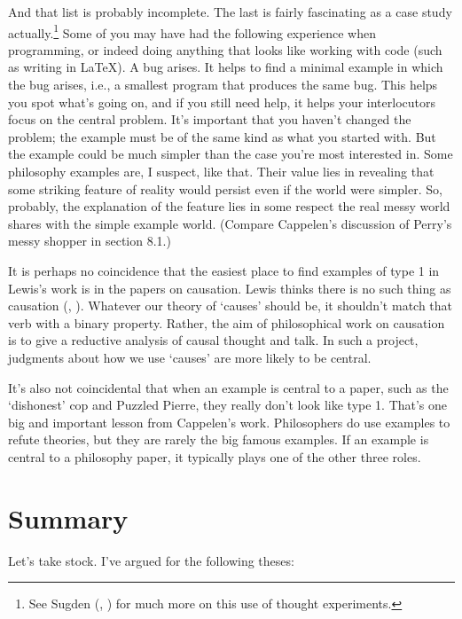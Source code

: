 \documentclass[
  11pt,
  letterpaper,
  DIV=11,
  numbers=noendperiod,
  twoside]{scrartcl}
\begin{document}
And that list is probably incomplete. The last is fairly fascinating as
a case study actually.\footnote{See Sugden
  (, ) for
  much more on this use of thought experiments.} Some of you may have
had the following experience when programming, or indeed doing anything
that looks like working with code (such as writing in LaTeX). A bug
arises. It helps to find a minimal example in which the bug arises,
i.e., a smallest program that produces the same bug. This helps you spot
what's going on, and if you still need help, it helps your interlocutors
focus on the central problem. It's important that you haven't changed
the problem; the example must be of the same kind as what you started
with. But the example could be much simpler than the case you're most
interested in. Some philosophy examples are, I suspect, like that. Their
value lies in revealing that some striking feature of reality would
persist even if the world were simpler. So, probably, the explanation of
the feature lies in some respect the real messy world shares with the
simple example world. (Compare Cappelen's discussion of Perry's messy
shopper in section 8.1.)

It is perhaps no coincidence that the easiest place to find examples of
type 1 in Lewis's work is in the papers on causation. Lewis thinks there
is no such thing as causation (,
). Whatever our theory of `causes'
should be, it shouldn't match that verb with a binary property. Rather,
the aim of philosophical work on causation is to give a reductive
analysis of causal thought and talk. In such a project, judgments about
how we use `causes' are more likely to be central.

It's also not coincidental that when an example is central to a paper,
such as the `dishonest' cop and Puzzled Pierre, they really don't look
like type 1. That's one big and important lesson from Cappelen's work.
Philosophers do use examples to refute theories, but they are rarely the
big famous examples. If an example is central to a philosophy paper, it
typically plays one of the other three roles.

\section{Summary}\label{sec-Summary}

Let's take stock. I've argued for the following theses:
\end{document}
